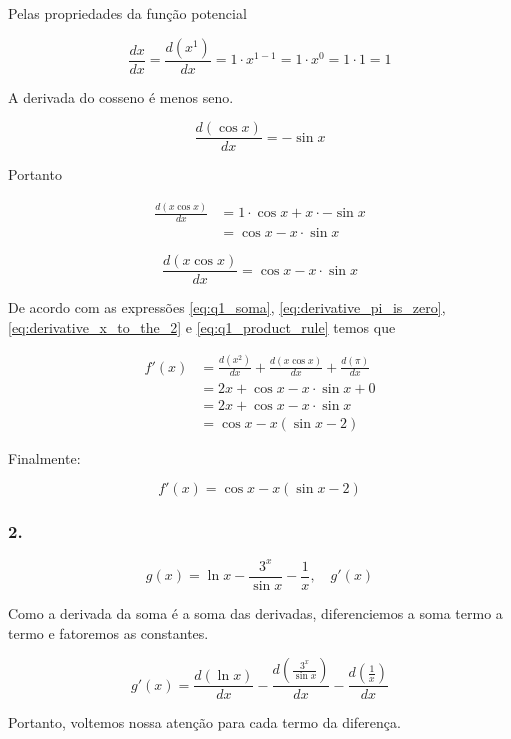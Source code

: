\documentclass{article}
\begin{document}
Pelas propriedades da função potencial

\[
    \frac{dx}{dx} = \frac{d(x^1)}{dx} = 1 \cdot x^{1-1} = 1 \cdot x^0 = 1 \cdot 1 = 1
\]

A derivada do cosseno é menos seno.

\[
    \frac{d (\cos x)}{dx} = - \sin x
\]

Portanto

\begin{align*}
    \frac{d (x\cos x)}{dx}
     & = 1 \cdot \cos x + x \cdot - \sin x \\
     & = \cos x - x \cdot \sin x
\end{align*}

\begin{equation}\label{eq:q1_product_rule}
    \frac{d (x\cos x)}{dx} = \cos x - x \cdot \sin x
\end{equation}

De acordo com as expressões
\ref{eq:q1_soma},
\ref{eq:derivative_pi_is_zero},
\ref{eq:derivative_x_to_the_2}
e \ref{eq:q1_product_rule} temos que

\begin{align*}
    f'(x)
     & = \frac{d (x^2)}{dx} + \frac{d (x\cos x)}{dx} + \frac{d(\pi)}{dx} \\
     & = 2x + \cos x - x \cdot \sin x + 0                                \\
     & = 2x + \cos x - x \cdot \sin x                                    \\
     & = \cos x - x (\sin x - 2)
\end{align*}

Finalmente:

\[
    f'(x) = \cos x - x (\sin x - 2)
\]


\subsubsection*{2.}

\[
    g(x) = \ln x - \frac{3^x}{\sin x} - \frac{1}{x}, \quad g'(x)
\]

Como a derivada da soma é a soma das derivadas, diferenciemos a soma termo a termo e fatoremos as constantes.

\begin{equation}\label{eq:q2_diferenca}
    g'(x) = \frac{d (\ln x)}{dx}
    - \frac{d (\frac{3^x}{\sin x})}{dx}
    - \frac{d(\frac{1}{x})}{dx}
\end{equation}

Portanto, voltemos nossa atenção para cada termo da diferença.
\end{document}
